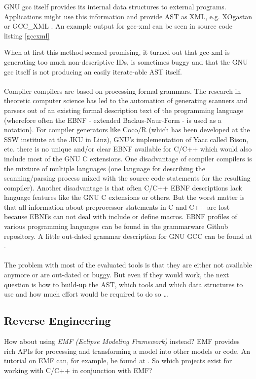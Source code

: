 GNU gcc itself provides its internal data structures to external programs.
Applications might use this information and provide AST as XML, e.g.
XOgastan\cite{XOgastan} or 
GCC\_XML \cite{gccxml}.
An example
output for gcc-xml can be seen in source code listing \ref{gccxml}

When at first this method seemed promising, it turned out
that gcc-xml is generating too much non-descriptive IDs, is
sometimes buggy and that the GNU gcc itself is not producing
an easily iterate-able AST itself.
\\ \ \\
Compiler compilers are based on processing formal
grammars. The research in theoretic computer science has led
to the automation of generating scanners and parsers out of an
existing formal description text of the programming language
(wherefore often the EBNF - extended Backus-Naur-Form - is
used as a notation).
For compiler generators like Coco/R\cite{COCOR}
(which has been developed at the SSW
institute at the JKU in Linz), 
GNU's implementation of Yacc called Bison\cite{Bison}, etc. there is no unique 
and/or clear EBNF available for C/C++ which would also include most of the GNU C extensions.
One disadvantage of compiler
compilers is the mixture of multiple languages (one language
for describing the scanning/parsing process mixed with the
source code statements for the resulting compiler). Another
disadvantage is that often C/C++ EBNF descriptions lack
language features like the GNU C extensions or others. But the worst
matter is that all information about preprocessor statements
in C and C++ are lost because EBNFs can not deal with
include or define macros.
EBNF profiles of various programming languages can
be found in the grammarware Github repository\cite{Grammarzoo}.
A little out-dated grammar description 
for GNU GCC can be found at \cite{GNUCEBNF}.
\\ \ \\
The problem with most of the evaluated tools is that they are either 
not available anymore or are out-dated or buggy.
But even if they would work, 
the next question is how to build-up the AST, 
which tools and which data structures to use and 
how much effort would be required to do so \dots

\subsection{Reverse Engineering}
How about using {\it EMF (Eclipse Modeling Framework)}
\cite{Eclipse_EMF}
\cite{steinberg2008emf}
instead? EMF provides rich APIs for processing and transforming 
a model into other models or code.
An tutorial on EMF can, for example, be found at 
\cite{EMF_Tutorial}.
So which projects
exist for working with C/C++ in conjunction with EMF?


